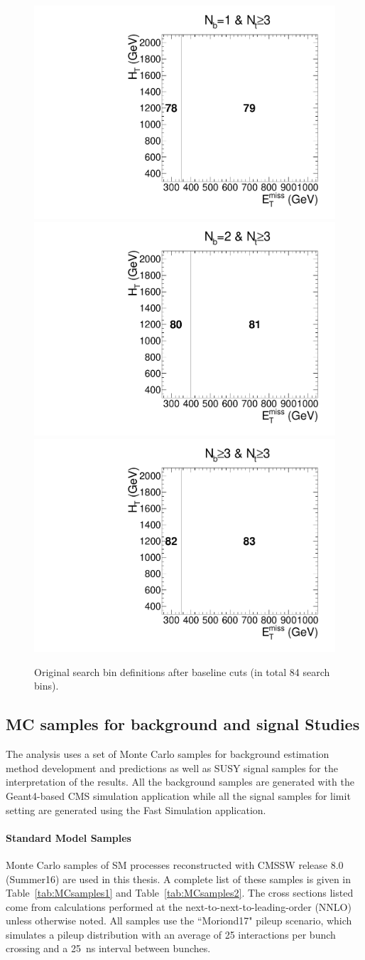 \begin{figure}[h]
\begin{center}
    \includegraphics[width=0.30\linewidth]{sections/mc4/EvtSelSBOpt/figures/poly_MT2_vs_met_6.pdf} 
    \includegraphics[width=0.30\linewidth]{sections/mc4/EvtSelSBOpt/figures/poly_MT2_vs_met_7.pdf} 
    \includegraphics[width=0.30\linewidth]{sections/mc4/EvtSelSBOpt/figures/poly_MT2_vs_met_8.pdf} \\
    \caption{Original search bin definitions after baseline cuts (in total 84 search bins). }
    \label{fig:SBXX}
  \end{center}
\end{figure}

\subsection{MC samples for background and signal Studies}
\label{sec:sm-mc}

The analysis uses a set of Monte Carlo samples for background estimation method
development and predictions as well as SUSY signal samples for the interpretation
of the results. All the
background samples are generated with the Geant4-based CMS simulation 
application while all the signal samples for limit setting are generated
using the Fast Simulation application.

\paragraph{Standard Model Samples}

Monte Carlo samples of SM processes reconstructed with CMSSW release 8.0 (Summer16) are used in this thesis. A complete list of these samples is given in Table~\ref{tab:MCsamples1} and Table~\ref{tab:MCsamples2}. The cross sections listed come from calculations performed at the next-to-next-to-leading-order (NNLO) unless otherwise noted. All samples use the ``Moriond17" pileup scenario, which simulates a pileup distribution with an average of 25 interactions per bunch crossing and a 25~ns interval between bunches.

